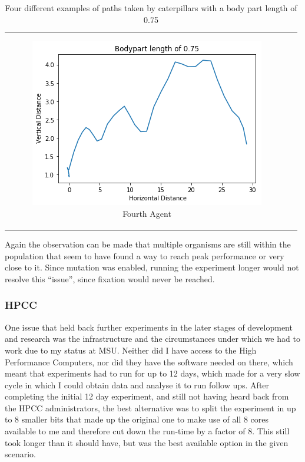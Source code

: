 \documentclass[12pt,oneside,listof=totoc,paper=a4,headings=small]{scrbook}
\begin{document}
{\begin{table}[h!]
\begin{tabular}{cc}
\begin{subfigure}{0.4\textwidth}\centering\includegraphics[width=0.75\columnwidth]{images/length_075_4.png}\caption{Fourth Agent}\label{fig:fourplotlengthd}\end{subfigure}\\
\end{tabular}
\caption{Four different examples of paths taken by caterpillars with a body part length of 0.75}
\label{tab:fourplotlength}
\end{table}
}

Again the observation can be made that multiple organisms are still within the population that seem to have found a way to reach peak performance or very close to it. Since mutation was enabled, running the experiment longer would not resolve this ``issue'', since fixation would never be reached. 



\subsubsection{HPCC} \label{sssec:hpcc}
One issue that held back further experiments in the later stages of development and research was the infrastructure and the circumstances under which we had to work due to my status at MSU. Neither did I have access to the High Performance Computers, nor did they have the software needed on there, which meant that experiments had to run for up to 12 days, which made for a very slow cycle in which I could obtain data and analyse it to run follow ups. After completing the initial 12 day experiment, and still not having heard back from the HPCC administrators, the best alternative was to split the experiment in up to 8 smaller bits that made up the original one to make use of all 8 cores available to me and therefore cut down the run-time by a factor of 8. This still took longer than it should have, but was the best available option in the given scenario.
\newpage
\end{document}
